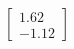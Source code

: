 \documentclass[preview]{standalone}
\begin{document}
\begin{align*}
\begin{bmatrix} 1.62 \\ -1.12 \end{bmatrix}
\end{align*}
\end{document}

